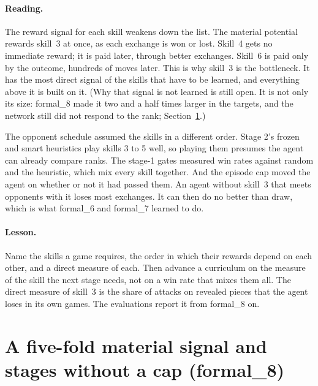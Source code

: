 \paragraph{Reading.} The reward signal for each skill weakens down the list. The material
potential rewards skill~3 at once, as each exchange is won or lost. Skill~4 gets no immediate
reward; it is paid later, through better exchanges. Skill~6 is paid only by the outcome, hundreds
of moves later. This is why skill~3 is the bottleneck. It has the most direct signal of the skills
that have to be learned, and everything above it is built on it. (Why that signal is not learned
is still open. It is not only its size: formal\_8 made it two and a half times larger in the
targets, and the network still did not respond to the rank; Section~\ref{sec:formal8}.)

The opponent schedule assumed the skills in a different order. Stage 2's frozen and smart
heuristics play skills 3 to 5 well, so playing them presumes the agent can already compare ranks.
The stage-1 gates measured win rates against random and the heuristic, which mix every skill
together. And the episode cap moved the agent on whether or not it had passed them. An agent
without skill~3 that meets opponents with it loses most exchanges. It can then do no better than
draw, which is what formal\_6 and formal\_7 learned to do.

\paragraph{Lesson.} Name the skills a game requires, the order in which their rewards depend on
each other, and a direct measure of each. Then advance a curriculum on the measure of the skill the
next stage needs, not on a win rate that mixes them all. The direct measure of skill~3 is the
share of attacks on revealed pieces that the agent loses in its own games. The evaluations report
it from formal\_8 on.

\section{A five-fold material signal and stages without a cap (formal\_8)}
\label{sec:formal8}

